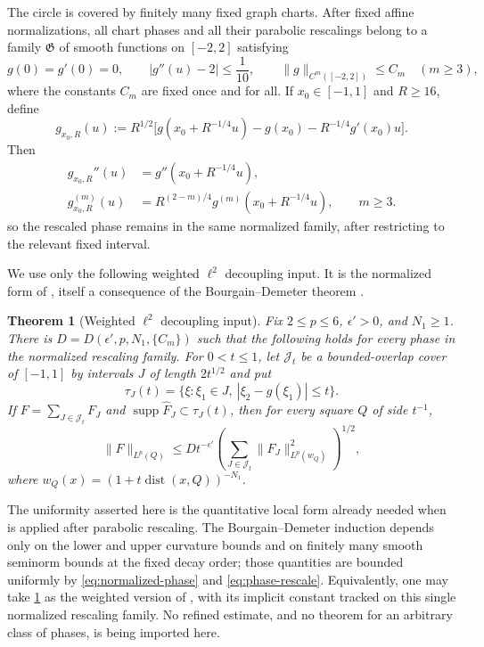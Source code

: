 \documentclass[11pt,letterpaper]{amsart}
\newtheorem{theorem}{Theorem}[section]
\newcommand{\supp}{\operatorname{supp}}
\newcommand{\dist}{\operatorname{dist}}
\begin{document}
The circle is covered by finitely many fixed graph charts.  After fixed affine
normalizations, all chart phases and all their parabolic rescalings belong to
a family $\mathfrak G$ of smooth functions on $[-2,2]$ satisfying
\begin{equation}\label{eq:normalized-phase}
 g(0)=g'(0)=0,\qquad |g''(u)-2|\le\frac1{10},\qquad
 \|g\|_{C^m([-2,2])}\le C_m\quad(m\ge3),
\end{equation}
where the constants $C_m$ are fixed once and for all.  If $x_0\in[-1,1]$
and $R\ge16$, define
\begin{equation}\label{eq:phase-rescale}
 g_{x_0,R}(u)
 :=R^{1/2}\bigl[g(x_0+R^{-1/4}u)-g(x_0)
                  -R^{-1/4}g'(x_0)u\bigr].
\end{equation}
Then
\begin{align*}
 g_{x_0,R}''(u)&=g''(x_0+R^{-1/4}u),\\
 g_{x_0,R}^{(m)}(u)&=R^{(2-m)/4}g^{(m)}(x_0+R^{-1/4}u),
 \qquad m\ge3.
\end{align*}
so the rescaled phase remains in the same normalized family, after restricting
to the relevant fixed interval.

We use only the following weighted $\ell^2$ decoupling input.  It is the
normalized form of \cite[Theorem~4.1]{GIOW}, itself a consequence of the
Bourgain--Demeter theorem \cite{BDDecoupling}.

\begin{theorem}[Weighted $\ell^2$ decoupling input]
\label{thm:appendix-l2}
Fix $2\le p\le6$, $\epsilon'>0$, and $N_1\ge1$.  There is
$D=D(\epsilon',p,N_1,\{C_m\})$ such that the following holds for every phase
in the normalized rescaling family.  For $0<t\le1$, let $\mathcal J_t$ be a
bounded-overlap cover of $[-1,1]$ by intervals $J$ of length $2t^{1/2}$ and
put
\[
 \tau_J(t)=\{\xi:\xi_1\in J,\ |\xi_2-g(\xi_1)|\le t\}.
\]
If $F=\sum_{J\in\mathcal J_t}F_J$ and
$\supp\widehat F_J\subset\tau_J(t)$, then for every square $Q$ of side
$t^{-1}$,
\begin{equation}\label{eq:appendix-l2}
 \|F\|_{L^p(Q)}
 \le D t^{-\epsilon'}
 \left(\sum_{J\in\mathcal J_t}
       \|F_J\|_{L^p(w_Q)}^2\right)^{1/2},
\end{equation}
where $w_Q(x)=(1+t\dist(x,Q))^{-N_1}$.
\end{theorem}

The uniformity asserted here is the quantitative local form already
needed when \cite[Theorem~4.1]{GIOW} is applied after parabolic rescaling.
The Bourgain--Demeter induction depends only on the lower and upper curvature
bounds and on finitely many smooth seminorm bounds at the fixed decay order;
those quantities are bounded uniformly by \eqref{eq:normalized-phase} and
\eqref{eq:phase-rescale}.  Equivalently, one may take
\cref{thm:appendix-l2} as the weighted version of
\cite[Theorem~4.1]{GIOW}, with its implicit constant tracked on this single
normalized rescaling family.  No refined estimate, and no theorem for an
arbitrary class of phases, is being imported here.
\end{document}

